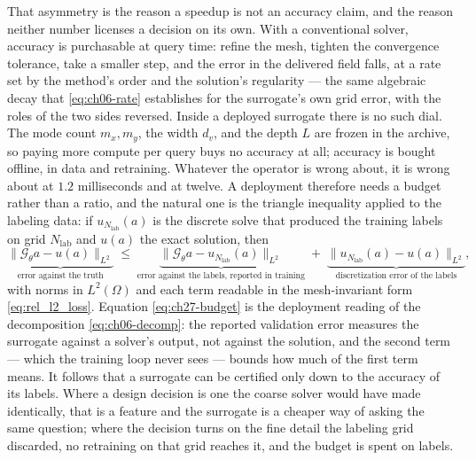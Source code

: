 That asymmetry is the reason a speedup is not an accuracy claim, and the reason
neither number licenses a decision on its own. With a conventional solver,
accuracy is purchasable at query time: refine the mesh, tighten the convergence
tolerance, take a smaller step, and the error in the delivered field falls, at a
rate set by the method's order and the solution's regularity --- the same
algebraic decay that \eqref{eq:ch06-rate} establishes for the surrogate's own
grid error, with the roles of the two sides reversed.
Inside a deployed surrogate there is no such dial.
The mode count $m_x, m_y$, the width $d_v$, and the depth $L$ are frozen in the
archive, so paying more compute per query buys no accuracy at all; accuracy is
bought offline, in data and retraining. Whatever the operator is wrong about, it is
wrong about at $1.2$ milliseconds and at twelve. A deployment therefore needs a
budget rather than a ratio, and the natural one is the triangle inequality applied
to the labeling data: if $u_{N_{\mathrm{lab}}}(a)$ is the discrete solve that
produced the training labels on grid $N_{\mathrm{lab}}$ and $u(a)$ the exact
solution, then
\begin{equation}
  \label{eq:ch27-budget}
  \underbrace{\|\mathcal{G}_\theta a - u(a)\|_{L^{2}}}_{\text{error against the truth}}
  \;\le\;
  \underbrace{\|\mathcal{G}_\theta a - u_{N_{\mathrm{lab}}}(a)\|_{L^{2}}}_{\text{error against the labels, reported in training}}
  \;+\;
  \underbrace{\|u_{N_{\mathrm{lab}}}(a) - u(a)\|_{L^{2}}}_{\text{discretization error of the labels}},
\end{equation}
with norms in $L^{2}(\Omega)$ and each term readable in the mesh-invariant form
\eqref{eq:rel_l2_loss}.
Equation \eqref{eq:ch27-budget} is the deployment reading
of the decomposition \eqref{eq:ch06-decomp}: the reported validation error measures
the surrogate against a solver's output, not against the solution, and the second
term --- which the training loop never sees --- bounds how much of the first term
means. It follows that a surrogate can be certified only down to the accuracy of
its labels. Where a design decision is one the coarse solver would have made
identically, that is a feature and the surrogate is a cheaper way of asking the
same question; where the decision turns on the fine detail the labeling grid
discarded, no retraining on that grid reaches it, and the budget is spent on
labels.

